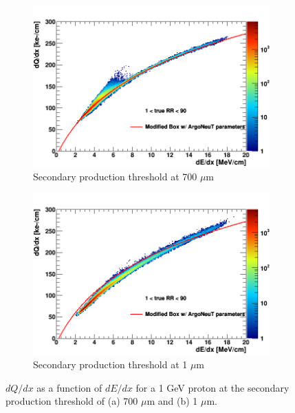 \begin{figure}[b!]
        \centering
        \begin{subfigure}[b]{0.495\textwidth}
            \centering
            \includegraphics[width=\textwidth]{proton_700um}
            \caption{Secondary production threshold at 700 $\mu$m}%
            \label{fig:proton_2d_700}
        \end{subfigure}
        \hfill
        \begin{subfigure}[b]{0.495\textwidth}  
            \centering 
            \includegraphics[width=\textwidth]{proton_1um}
            \caption{Secondary production threshold at 1 $\mu$m}%
            \label{fig:proton_2d_1}
        \end{subfigure}
	\caption[Energy-Charge Scale of Protons at Different Delta Ray Thresholds]{$dQ/dx$ as a function of $dE/dx$ for a 1 GeV proton at the secondary production threshold of (a) 700 $\mu$m and (b) 1 $\mu$m.}
        \label{fig:proton_2d}
\end{figure}

